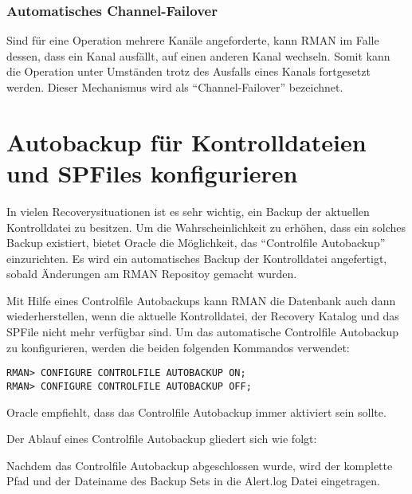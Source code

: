         \subsubsection{Automatisches Channel-Failover}
          Sind für eine Operation mehrere Kanäle angeforderte, kann RMAN im Falle dessen, dass ein Kanal ausfällt, auf einen anderen Kanal wechseln. Somit kann die Operation unter Umständen trotz des Ausfalls eines Kanals fortgesetzt werden. Dieser Mechanismus wird als \enquote{Channel-Failover} bezeichnet.
    \section{Autobackup für Kontrolldateien und SPFiles konfigurieren}
      \label{controlfileautobackup}
      In vielen Recoverysituationen ist es sehr wichtig, ein Backup der aktuellen Kontrolldatei zu besitzen. Um die Wahrscheinlichkeit zu erhöhen, dass ein solches Backup existiert, bietet Oracle die Möglichkeit, das \enquote{Controlfile Autobackup} einzurichten. Es wird ein automatisches Backup der Kontrolldatei angefertigt, sobald Änderungen am RMAN Repositoy gemacht wurden.

      Mit Hilfe eines Controlfile Autobackups kann RMAN die Datenbank auch dann wiederherstellen, wenn die aktuelle Kontrolldatei, der Recovery Katalog und das SPFile nicht mehr verfügbar sind.  Um das automatische Controlfile Autobackup zu konfigurieren, werden die beiden folgenden Kommandos verwendet:
      \begin{lstlisting}[caption={Controlfile Autobackup konfigurieren},label=admin1024,language=rman]
RMAN> CONFIGURE CONTROLFILE AUTOBACKUP ON;
RMAN> CONFIGURE CONTROLFILE AUTOBACKUP OFF;
      \end{lstlisting}
      \begin{merke}
        Oracle empfiehlt, dass das Controlfile Autobackup immer aktiviert sein sollte.
      \end{merke}

      Der Ablauf eines Controlfile Autobackup gliedert sich wie folgt:

      Nachdem das Controlfile Autobackup abgeschlossen wurde, wird der komplette Pfad und der Dateiname des Backup Sets in die Alert.log Datei eingetragen.

